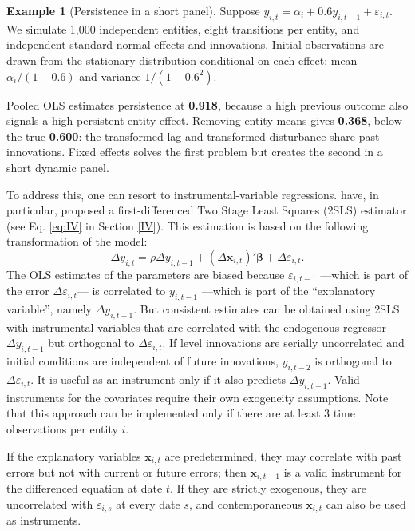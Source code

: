 \documentclass[
  11pt,
]{book}
\theoremstyle{definition}
\theoremstyle{definition}
\newtheorem{example}{Example}[chapter]
\theoremstyle{definition}
\theoremstyle{definition}
\theoremstyle{remark}
\begin{document}
\begin{example}[Persistence in a short panel]
\protect\hypertarget{exm:panel-dynamic-simulation}{}\label{exm:panel-dynamic-simulation}Suppose \(y_{i,t}=\alpha_i+0.6y_{i,t-1}+\varepsilon_{i,t}\). We simulate 1,000 independent entities, eight transitions per entity, and independent standard-normal effects and innovations. Initial observations are drawn from the stationary distribution conditional on each effect: mean \(\alpha_i/(1-0.6)\) and variance \(1/(1-0.6^2)\).

Pooled OLS estimates persistence at \textbf{0.918}, because a high previous outcome also signals a high persistent entity effect. Removing entity means gives \textbf{0.368}, below the true \textbf{0.600}: the transformed lag and transformed disturbance share past innovations. Fixed effects solves the first problem but creates the second in a short dynamic panel.
\end{example}

To address this, one can resort to instrumental-variable regressions. \citet{Anderson_Hsiao_1982} have, in particular, proposed a first-differenced Two Stage Least Squares (2SLS) estimator (see Eq. \eqref{eq:IV} in Section \ref{IV}). This estimation is based on the following transformation of the model:
\begin{equation}
\Delta y_{i,t} = \rho \Delta y_{i,t-1} + (\Delta \mathbf{x}_{i,t})'\boldsymbol\beta + \Delta\varepsilon_{i,t}.\label{eq:paneldynFisrtDiff}
\end{equation}
The OLS estimates of the parameters are biased because \(\varepsilon_{i,t-1}\) ---which is part of the error \(\Delta\varepsilon_{i,t}\)--- is correlated to \(y_{i,t-1}\) ---which is part of the ``explanatory variable'', namely \(\Delta y_{i,t-1}\). But consistent estimates can be obtained using 2SLS with instrumental variables that are correlated with the endogenous regressor \(\Delta y_{i,t-1}\) but orthogonal to \(\Delta\varepsilon_{i,t}\). If level innovations are serially uncorrelated and initial conditions are independent of future innovations, \(y_{i,t-2}\) is orthogonal to \(\Delta\varepsilon_{i,t}\). It is useful as an instrument only if it also predicts \(\Delta y_{i,t-1}\). Valid instruments for the covariates require their own exogeneity assumptions. Note that this approach can be implemented only if there are at least 3 time observations per entity \(i\).

If the explanatory variables \(\mathbf{x}_{i,t}\) are predetermined, they may correlate with past errors but not with current or future errors; then \(\mathbf{x}_{i,t-1}\) is a valid instrument for the differenced equation at date \(t\). If they are strictly exogenous, they are uncorrelated with \(\varepsilon_{i,s}\) at every date \(s\), and contemporaneous \(\mathbf{x}_{i,t}\) can also be used as instruments.
\end{document}
